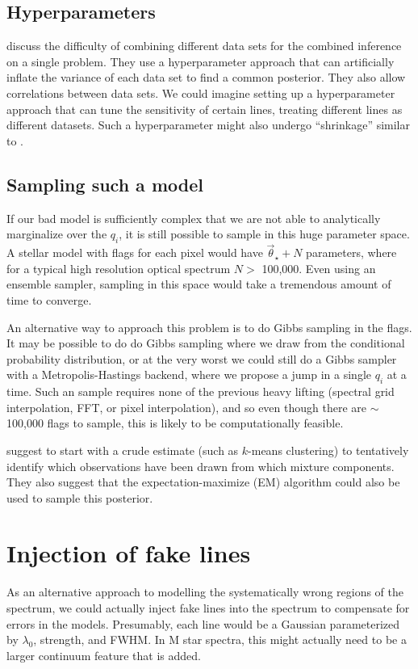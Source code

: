 \documentclass[preprint]{aastex} %
\newcommand{\vt}{\vec{\theta}}
\newcommand{\vstar}{\vt_{\star}}
\begin{document}
\subsection{Hyperparameters}
\citep{mb13} discuss the difficulty of combining different data sets for the combined inference on a single problem. They use a hyperparameter approach that can artificially inflate the variance of each data set to find a common posterior. They also allow correlations between data sets. We could imagine setting up a hyperparameter approach that can tune the sensitivity of certain lines, treating different lines as different datasets. Such a hyperparameter might also undergo ``shrinkage'' similar to \citet{kru10}.

\subsection{Sampling such a model}
If our bad model is sufficiently complex that we are not able to analytically marginalize over the $q_i$, it is still possible to sample in this huge parameter space. A stellar model with flags for each pixel would have $\vstar + N$ parameters, where for a typical high resolution optical spectrum $N >$ 100,000. Even using an ensemble sampler, sampling in this space would take a tremendous amount of time to converge. 

An alternative way to approach this problem is to do Gibbs sampling in the flags. It may be possible to do do Gibbs sampling where we draw from the conditional probability distribution, or at the very worst we could still do a Gibbs sampler with a Metropolis-Hastings backend, where we propose a jump in a single $q_i$ at a time. Such an sample requires none of the previous heavy lifting (spectral grid interpolation, FFT, or pixel interpolation), and so even though there are $\sim$ 100,000 flags to sample, this is likely to be computationally feasible.

\citet{gcs+04} suggest to start with a crude estimate (such as $k$-means clustering) to tentatively identify which observations have been drawn from which mixture components. They also suggest that the expectation-maximize (EM) algorithm could also be used to sample this posterior.

\section{Injection of fake lines}
As an alternative approach to modelling the systematically wrong regions of the spectrum, we could actually inject fake lines into the spectrum to compensate for errors in the models. Presumably, each line would be a Gaussian parameterized by $\lambda_0$, strength, and FWHM. In M star spectra, this might actually need to be a larger continuum feature that is added.
\end{document}

